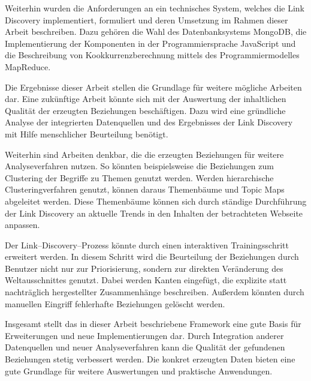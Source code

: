 Weiterhin wurden die Anforderungen an ein technisches System, welches die Link Discovery implementiert, formuliert und deren Umsetzung im Rahmen dieser Arbeit beschreiben. Dazu gehören die Wahl des Datenbanksystems MongoDB, die Implementierung der Komponenten in der Programmiersprache JavaScript und die Beschreibung von Kookkurrenzberechnung mittels des Programmiermodelles MapReduce.

Die Ergebnisse dieser Arbeit stellen die Grundlage für weitere mögliche Arbeiten dar. Eine zukünftige Arbeit könnte sich mit der Auswertung der inhaltlichen Qualität der erzeugten Beziehungen beschäftigen. Dazu wird eine gründliche Analyse der integrierten Datenquellen und des Ergebnisses der Link Discovery mit Hilfe menschlicher Beurteilung benötigt.

Weiterhin sind Arbeiten denkbar, die die erzeugten Beziehungen für weitere Analyseverfahren nutzen. So könnten beispielsweise die Beziehungen zum Clustering der Begriffe zu Themen genutzt werden. Werden hierarchische Clusteringverfahren genutzt, können daraus Themenbäume und Topic Maps abgeleitet werden. Diese Themenbäume können sich durch ständige Durchführung der Link Discovery an aktuelle Trends in den Inhalten der betrachteten Webseite anpassen.

Der Link--Discovery--Prozess könnte durch einen interaktiven Trainingsschritt erweitert werden. In diesem Schritt wird die Beurteilung der Beziehungen durch Benutzer nicht nur zur Priorisierung, sondern zur direkten Veränderung des Weltausschnittes genutzt. Dabei werden Kanten eingefügt, die explizite statt nachträglich hergestellter Zusammenhänge beschreiben. Außerdem könnten durch manuellen Eingriff fehlerhafte Beziehungen gelöscht werden.

Insgesamt stellt das in dieser Arbeit beschriebene Framework eine gute Basis für Erweiterungen und neue Implementierungen dar. Durch Integration anderer Datenquellen und neuer Analyseverfahren kann die Qualität der gefundenen Beziehungen stetig verbessert werden. Die konkret erzeugten Daten bieten eine gute Grundlage für weitere Auswertungen und praktische Anwendungen.